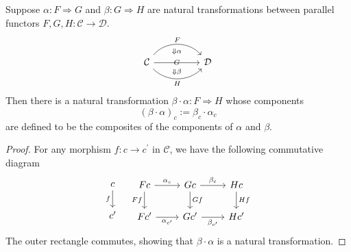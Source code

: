 \documentclass[12pt, oneside]{book}
\begin{document}
\begin{lemma}
    \label{lem: vertical composition}
    Suppose $\alpha: F \Rightarrow G$ and $\beta: G \Rightarrow H$ are natural transformations between parallel functors $F, G, H: \mathcal{C} \rightarrow \mathcal{D}$.
    \begin{equation*}
        \begin{tikzcd}
            \mathcal{C}
            \arrow[rr, bend left=50, "F"]
            \arrow[rr,, "G"{yshift=-1ex},"\Downarrow \alpha"{yshift=1.5ex},"\Downarrow \beta"{yshift=-3.5ex}]
            \arrow[rr, bend right=45, "H"']
            &  &
            \mathcal{D}
        \end{tikzcd}
    \end{equation*}
    Then there is a natural transformation $\beta \cdot \alpha: F \Rightarrow H$ whose components
    \begin{equation*}
        (\beta \cdot \alpha)_c:=\beta_c \cdot \alpha_c
    \end{equation*}
    are defined to be the composites of the components of $\alpha$ and $\beta$.
    \begin{proof}
        For any morphism $f: c \rightarrow c^{\prime}$ in $\mathcal{C}$, we have the following commutative diagram
        \begin{equation*}
            \begin{tikzcd}
                c\arrow[d,"f"']\\
                c^\prime
            \end{tikzcd}
            \quad
            \begin{tikzcd}
                Fc \arrow[r, "\alpha_c"] \arrow[d, "Ff"'] & Gc \arrow[r, "\beta_c"] \arrow[d, "Gf"] & Hc \arrow[d, "Hf"] \\
                Fc^{\prime} \arrow[r, "\alpha_{c^{\prime}}"'] & Gc^{\prime} \arrow[r, "\beta_{c^{\prime}}"'] & Hc^{\prime}
            \end{tikzcd}
        \end{equation*}
        The outer rectangle commutes, showing that $\beta \cdot \alpha$ is a natural transformation.
    \end{proof}
\end{lemma}
\end{document}

